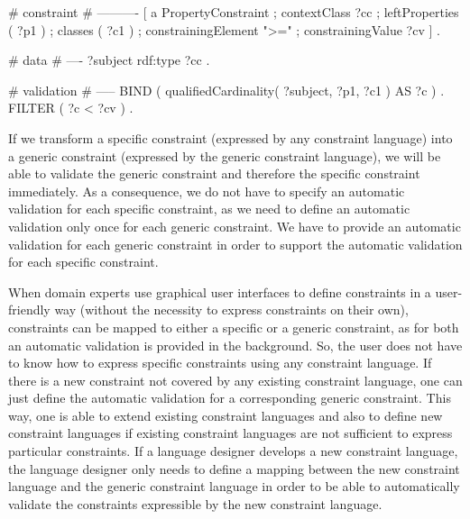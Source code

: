 \documentclass{llncs}
\begin{document}
\begin{ex}
# constraint
# ----------
[   a PropertyConstraint ;
    contextClass ?cc ;
    leftProperties ( ?p1 ) ;
    classes ( ?c1 ) ;
    constrainingElement ">=" ;
    constrainingValue ?cv ] .
		
# data
# ----
?subject rdf:type ?cc .

# validation
# -----
BIND ( qualifiedCardinality( ?subject, ?p1, ?c1 ) AS ?c ) .
FILTER ( ?c < ?cv ) .		  
\end{ex}

If we transform a specific constraint (expressed by any constraint language) into a generic constraint (expressed by the generic constraint language), we will be able to validate the generic constraint and therefore the specific constraint immediately. 
As a consequence, we do not have to specify an automatic validation for each specific constraint, as we need to define an automatic validation only once for each generic constraint. 
We have to provide an automatic validation for each generic constraint in order to support the automatic validation for each specific constraint.

When domain experts use graphical user interfaces to define constraints in a user-friendly way (without the necessity to express constraints on their own), 
constraints can be mapped to either a specific or a generic constraint, as for both an automatic validation is provided in the background.    
So, the user does not have to know how to express specific constraints using any constraint language.
If there is a new constraint not covered by any existing constraint language, one can just define the automatic validation for a corresponding generic constraint.
This way, one is able to extend existing constraint languages and also to define new constraint languages if existing constraint languages are not sufficient to express particular constraints.
If a language designer develops a new constraint language, 
the language designer only needs to define a mapping between the new constraint language and the generic constraint language
in order to be able to automatically validate the constraints expressible by the new constraint language.
\end{document}
